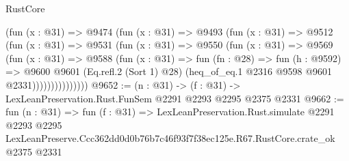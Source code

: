\begin{lexlean}{RustCore}
\begin{coremodule}
                (fun (x : @31) =>
                @9474
                  (fun (x : @31) =>
                  @9493
                    (fun (x : @31) =>
                    @9512
                      (fun (x : @31) =>
                      @9531
                        (fun (x : @31) =>
                        @9550
                          (fun (x : @31) =>
                          @9569
                            (fun (x : @31) =>
                            @9588
                              (fun (x : @31) =>
                              fun (fn : @28) =>
                              fun (h : @9592) =>
                              @9600
                                @9601
                                (Eq.refl.{2} (Sort 1) @28)
                                (heq_of_eq.{1} @2316 @9598 @9601 @2331)))))))))))))))
@9652 := (n : @31) -> (f : @31) -> LexLeanPreservation.Rust.FunSem @2291 @2293 @2295 @2375 @2331
@9662 := fun (n : @31) =>
  fun (f : @31) =>
  LexLeanPreservation.Rust.simulate
    @2291
    @2293
    @2295
    LexLeanPreserve.Ccc362dd0d0b76b7c46f93f7f38ec125e.R67.RustCore.crate_ok
    @2375
    @2331
\end{coremodule}
\end{lexlean}
